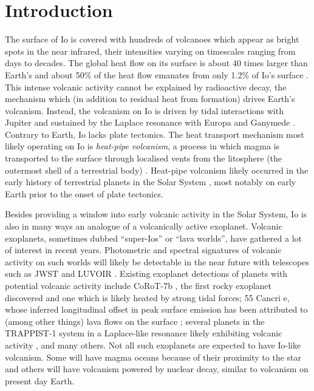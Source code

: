\documentclass[linenumbers,modern]{aastex62}
\begin{document}
\section{Introduction}
The surface of Io is covered with hundreds of volcanoes which appear as bright spots in the near infrared, their intensities varying on timescales ranging from days to decades.
The global heat flow on its surface is about 40 times larger than Earth's \citep{breuer2007,davies2010} and about 50\% of the heat flow emanates from only 1.2\% of Io's surface \citep{veeder2012}.
This intense volcanic activity cannot be explained by radioactive decay, the mechanism which (in addition to residual heat from formation) drives Earth's volcanism.
Instead, the volcanism on Io is driven by tidal interactions with Jupiter and sustained by the Laplace resonance with Europa and Ganymede \citep{peale1979}.
Contrary to Earth, Io lacks plate tectonics.
The heat transport mechanism most likely operating on Io is \emph{heat-pipe volcanism}, a process in which magma is transported to the surface through localised vents from the litosphere  (the outermost shell of a terrestrial body) \citep{oreilly1981}.
Heat-pipe volcanism likely occurred in the early history of terrestrial planets in the Solar System \citep{moore2013,moore2017}, most notably on early Earth prior to the onset of plate tectonics.

Besides providing a window into early volcanic activity in the Solar System, Io is also in many ways an analogue of a volcanically active exoplanet.
Volcanic exoplanets, sometimes dubbed ``super-Ios'' or ``lava worlds'', have gathered a lot of interest in recent years.
Photometric and spectral signatures of volcanic activity on such worlds will likely be detectable in the near future with telescopes such as JWST and LUVOIR \citep{kaltenegger2010,henning2018,oza2019,chao2020}.
Existing exoplanet detections of planets with potential volcanic activity include CoRoT-7b \citep{barnes2010}, the first rocky exoplanet discovered and one which is likely heated by strong tidal forces; 55 Cancri e, whose inferred longitudinal offset in peak surface emission has been attributed to (among other things) lava flows on the surface \citep{demory2016,demory2016d,hammond2017a}; several planets in the TRAPPIST-1 system in a Laplace-like resonance likely exhibiting volcanic activity \citep{kislyakova2017,dobos2019}, and many others.
Not all such exoplanets are expected to have Io-like volcanism.
Some will have magma oceans because of their proximity to the star and others will have volcanism powered by nuclear decay, similar to volcanism on present day Earth.
\end{document}
